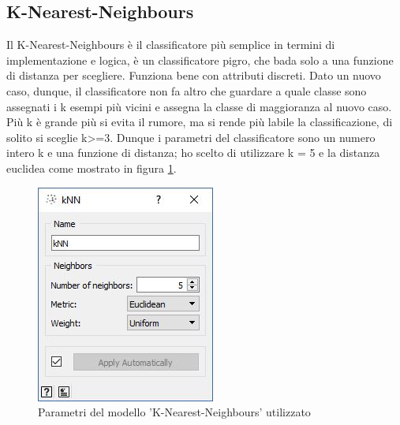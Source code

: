 \documentclass[a4paper, 12p]{report}
\begin{document}
	\subsection{K-Nearest-Neighbours}
	Il K-Nearest-Neighbours è il classificatore più semplice in termini di implementazione e logica, è un classificatore pigro, che bada solo a una funzione di distanza per scegliere. Funziona bene con attributi discreti.
Dato un nuovo caso, dunque, il classificatore non fa altro che guardare a quale classe sono assegnati i k esempi più vicini e assegna la classe di maggioranza al nuovo caso. Più k è grande più si evita il rumore, ma si rende più labile la classificazione, di solito si sceglie k>=3. Dunque i parametri del classificatore sono un numero intero k e una funzione di distanza; ho scelto di utilizzare k = 5 e la distanza euclidea come mostrato in figura \ref{fig:7}.
\begin{figure}	
	\centering
	\includegraphics[scale = 0.8]{img/Knn.JPG}
	\caption{Parametri del modello 'K-Nearest-Neighbours' utilizzato }\label{fig:7}
\end{figure}	

	
\end{document}
